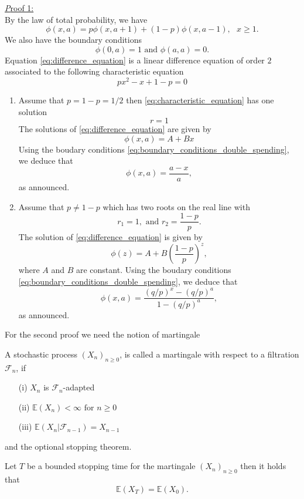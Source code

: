 \underline{\textit Proof 1:}\\
By the law of total probability, we have 
\begin{equation}\label{eq:difference_equation}
\phi(x,a) = p\phi(x,a+1)+(1-p)\phi(x,a-1),\text{ }x\geq1.
\end{equation}
We also have the boundary conditions
\begin{equation}\label{eq:boundary_conditions_double_spending}
\phi(0,a) = 1\text{ and }\phi(a,a) = 0.
\end{equation}
Equation \eqref{eq:difference_equation} is a linear difference equation of order $2$ associated to the following characteristic equation
\begin{equation}\label{eq:characteristic_equation}
px^2 - x + 1-p = 0
\end{equation}
\begin{enumerate}

\item Assume that $p=1-p=1/2$ then \eqref{eq:characteristic_equation} has one solution 
$$
r = 1
$$
The solutions of \eqref{eq:difference_equation} are given by 
$$
\phi(x,a) = A+Bx
$$
Using the boudary conditions \eqref{eq:boundary_conditions_double_spending}, we deduce that
$$
\phi(x,a) = \frac{a-x}{a},
$$
as announced.
\item Assume that $p\neq 1-p$
which has two roots on the real line with 
$$
r_1 = 1, \text{ and }r_2 = \frac{1-p}{p}.
$$
The solution of \eqref{eq:difference_equation} is given by 
$$
\phi(z)=A+B\left(\frac{1-p}{p}\right)^z,
$$
where $A$ and $B$ are constant. Using the boudary conditions \eqref{eq:boundary_conditions_double_spending}, we deduce that
$$
\phi(x,a) = \frac{(q/p)^x-(q/p)^a}{1 - (q/p)^a},
$$
as announced.
\end{enumerate}
For the second proof we need the notion of martingale
\begin{definition}
A stochastic process $(X_n)_{n\geq0}$, is called a martingale with respect to a filtration $\mathcal{F}_n$, if
\begin{itemize}
  \item[(i)] $X_n$ is $\mathcal{F}_n$-adapted
  \item[(ii)] $\mathbb{E}(X_n)<\infty\text{ for }n\geq0$ 
  \item[(iii)] $\mathbb{E}(X_n|\mathcal{F}_{n-1}) = X_{n-1}$
\end{itemize} 
\end{definition}
\noindent and the optional stopping theorem.
\begin{theo}
Let $T$ be a bounded stopping time for the martingale $(X_n)_{n\geq0}$ then it holds that 
$$
\mathbb{E}(X_T) = \mathbb{E}(X_0) .
$$

\end{theo}
